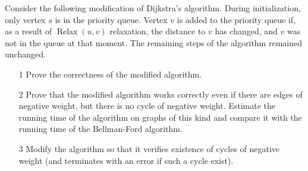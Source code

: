 \begin{prob}
Consider the following modification of Dijkstra's algorithm. During initialization, only vertex $s$ is in the priority queue. Vertex $v$ is added to the priority queue if, as a result of $\operatorname{Relax}(u, v)$ relaxation, the distance to $v$ has changed, and $v$ was not in the queue at that moment. The remaining steps of the algorithm remained unchanged.
\begin{itemize}
\item[1] Prove the correctness of the modified algorithm.
\item[2] Prove that the modified algorithm works correctly even if there are edges of negative weight, but there is no cycle of negative weight. Estimate the running time of the algorithm on graphs of this kind and compare it with the running time of the Bellman-Ford algorithm.
\item[3] Modify the algorithm so that it verifies existence of cycles of negative weight (and terminates with an error if such a cycle exist).
\end{itemize}
\end{prob}
\vskip 0.2in

